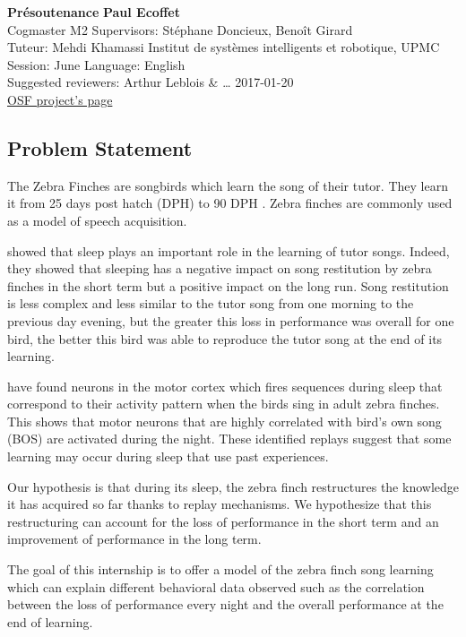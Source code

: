 \documentclass[a4paper]{article}
\begin{document}
\noindent
\large\textbf{Présoutenance} \hfill \textbf{Paul Ecoffet} \\
\normalsize Cogmaster M2 \hfill Supervisors: Stéphane Doncieux, Benoît Girard \\
Tuteur: Mehdi Khamassi \hfill Institut de systèmes intelligents et robotique, UPMC\\
Session: June \hfill Language: English\\
Suggested reviewers: Arthur Leblois \& … \hfill 2017-01-20\\
\href{https://osf.io/ja8k9/}{OSF project's page}
\begin{multicols}{1}
\section*{Problem Statement}

The Zebra Finches are songbirds which learn the song of their tutor. They learn
it from 25 days post hatch (DPH) to 90 DPH \parencite{liu_juvenile_2004}. Zebra
finches are commonly used as a model of speech acquisition.

\textcite{deregnaucourt_how_2005} showed that sleep plays an important role in
the learning of tutor songs. Indeed, they showed that sleeping has a negative
impact on song restitution by zebra finches in the short term but a positive
impact on the long run. Song restitution is less complex and less similar to the
tutor song from one morning to the previous day evening, but the greater this
loss in performance was overall for one bird, the better this bird was able to
reproduce the tutor song at the end of its learning.


\textcite{dave_song_2000} have found neurons in the motor cortex which fires
sequences during sleep that correspond to their activity pattern when the birds
sing in adult zebra finches. This shows that motor neurons that are highly
correlated with bird's own song (BOS) are activated during the night. These
identified replays suggest that some learning may occur during sleep that use
past experiences.

Our hypothesis is that during its sleep, the zebra finch restructures the
knowledge it has acquired so far thanks to replay mechanisms. We hypothesize
that this restructuring can account for the loss of performance in the short
term and an improvement of performance in the long term.

The goal of this internship is to offer a model of the zebra finch song
learning which can explain different behavioral data observed such as the
correlation between the loss of performance every night and the overall
performance at the end of learning.


\end{multicols}
\end{document}
